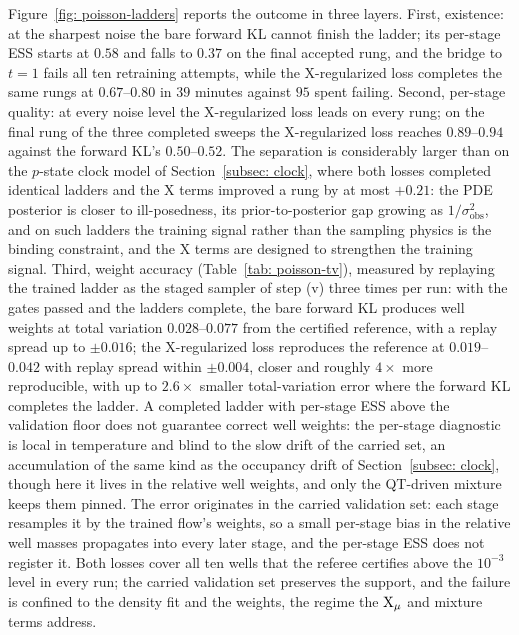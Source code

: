 \documentclass{article}
\begin{document}
Figure~\ref{fig: poisson-ladders} reports the outcome in three layers. First, existence: at the sharpest noise the bare forward KL cannot finish the ladder; its per-stage ESS starts at $0.58$ and falls to $0.37$ on the final accepted rung, and the bridge to $t = 1$ fails all ten retraining attempts, while the X-regularized loss completes the same rungs at $0.67$--$0.80$ in $39$ minutes against $95$ spent failing. Second, per-stage quality: at every noise level the X-regularized loss leads on every rung; on the final rung of the three completed sweeps the X-regularized loss reaches $0.89$--$0.94$ against the forward KL's $0.50$--$0.52$. The separation is considerably larger than on the $p$-state clock model of Section~\ref{subsec: clock}, where both losses completed identical ladders and the X terms improved a rung by at most $+0.21$: the PDE posterior is closer to ill-posedness, its prior-to-posterior gap growing as $1/\sigma_{\mathrm{obs}}^2$, and on such ladders the training signal rather than the sampling physics is the binding constraint, and the X terms are designed to strengthen the training signal. Third, weight accuracy (Table~\ref{tab: poisson-tv}), measured by replaying the trained ladder as the staged sampler of step (v) three times per run: with the gates passed and the ladders complete, the bare forward KL produces well weights at total variation $0.028$--$0.077$ from the certified reference, with a replay spread up to $\pm 0.016$; the X-regularized loss reproduces the reference at $0.019$--$0.042$ with replay spread within $\pm 0.004$, closer and roughly $4\times$ more reproducible, with up to $2.6\times$ smaller total-variation error where the forward KL completes the ladder. A completed ladder with per-stage ESS above the validation floor does not guarantee correct well weights: the per-stage diagnostic is local in temperature and blind to the slow drift of the carried set, an accumulation of the same kind as the occupancy drift of Section~\ref{subsec: clock}, though here it lives in the relative well weights, and only the QT-driven mixture keeps them pinned. The error originates in the carried validation set: each stage resamples it by the trained flow's weights, so a small per-stage bias in the relative well masses propagates into every later stage, and the per-stage ESS does not register it. Both losses cover all ten wells that the referee certifies above the $10^{-3}$ level in every run; the carried validation set preserves the support, and the failure is confined to the density fit and the weights, the regime the $\mathrm{X}_\mu$ and mixture terms address.
\end{document}

